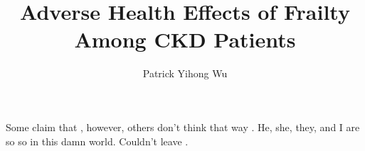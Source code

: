 \documentclass[jou]{apa6}
\title{Adverse Health Effects of Frailty Among CKD Patients}
\author{Patrick Yihong Wu}
\affiliation{College of Medicine, National Taiwan University}
\begin{document}
\maketitle

Some claim that \cite{S.2017}, however, others don't think that way \cite{McAdams-DeMarco2018}.
He, she, they, and I are so so in this damn world. Couldn't leave \cite{Cheawchanwattana2014}.



\end{document}
